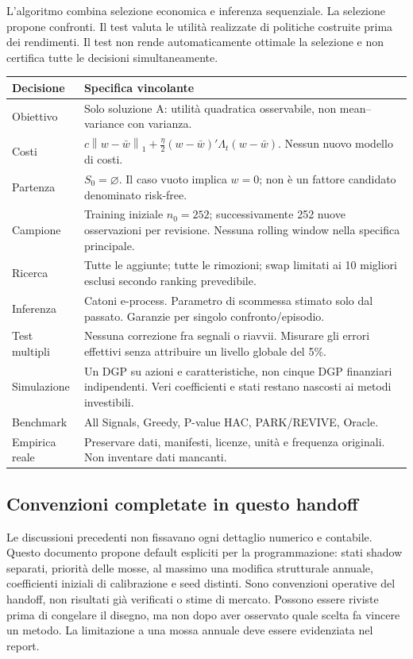 \documentclass[11pt,a4paper]{article}
\theoremstyle{definition}\newtheorem{definition}[theorem]{Definizione}
\theoremstyle{remark}\newtheorem{remark}[theorem]{Osservazione}
\newcommand{\norm}[1]{\left\lVert#1\right\rVert}\newcommand{\abs}[1]{\left|#1\right|}
\begin{document}
L'algoritmo combina selezione economica e inferenza sequenziale. La selezione propone confronti. Il test valuta le utilità realizzate di politiche costruite prima dei rendimenti. Il test non rende automaticamente ottimale la selezione e non certifica tutte le decisioni simultaneamente.

\begin{longtable}{p{.27\linewidth}p{.67\linewidth}}
\toprule Decisione & Specifica vincolante\\\midrule\endhead
Obiettivo & Solo soluzione A: utilità quadratica osservabile, non mean--variance con varianza.\\
Costi & $c\norm{w-\bar w}_1+\frac\eta2(w-\bar w)'\Lambda_t(w-\bar w)$. Nessun nuovo modello di costi.\\
Partenza & $S_0=\varnothing$. Il caso vuoto implica $w=0$; non è un fattore candidato denominato risk-free.\\
Campione & Training iniziale $n_0=252$; successivamente 252 nuove osservazioni per revisione. Nessuna rolling window nella specifica principale.\\
Ricerca & Tutte le aggiunte; tutte le rimozioni; swap limitati ai 10 migliori esclusi secondo ranking prevedibile.\\
Inferenza & Catoni e-process. Parametro di scommessa stimato solo dal passato. Garanzie per singolo confronto/episodio.\\
Test multipli & Nessuna correzione fra segnali o riavvii. Misurare gli errori effettivi senza attribuire un livello globale del 5\%.\\
Simulazione & Un DGP su azioni e caratteristiche, non cinque DGP finanziari indipendenti. Veri coefficienti e stati restano nascosti ai metodi investibili.\\
Benchmark & All Signals, Greedy, P-value HAC, PARK/REVIVE, Oracle.\\
Empirica reale & Preservare dati, manifesti, licenze, unità e frequenza originali. Non inventare dati mancanti.\\
\bottomrule
\end{longtable}

\subsection{Convenzioni completate in questo handoff}
Le discussioni precedenti non fissavano ogni dettaglio numerico e contabile. Questo documento propone default espliciti per la programmazione: stati shadow separati, priorità delle mosse, al massimo una modifica strutturale annuale, coefficienti iniziali di calibrazione e seed distinti. Sono convenzioni operative del handoff, non risultati già verificati o stime di mercato. Possono essere riviste prima di congelare il disegno, ma non dopo aver osservato quale scelta fa vincere un metodo. La limitazione a una mossa annuale deve essere evidenziata nel report.
\end{document}
